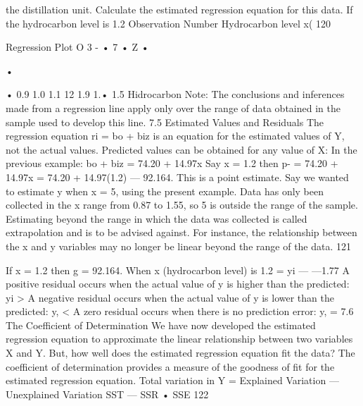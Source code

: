 the distillation unit. Calculate the estimated regression equation for this data. If the hydrocarbon 
level is 1.2%
Observation Number Hydrocarbon level x(%
120 


Regression Plot 
O 
3 - 
• 7 • Z • 

• 

• 
0.9 1.0 1.1 12 1.9 1.• 1.5 
Hidrocarbon 
Note: The conclusions and inferences made from a regression line apply only over the range of data 
obtained in the sample used to develop this line. 
7.5 Estimated Values and Residuals 
The regression equation ri = bo + biz is an equation for the estimated values of Y, not the actual values. Predicted values can be obtained for any value of X: In the previous example: bo + biz = 74.20 + 14.97x Say x = 1.2 then p- = 74.20 + 14.97x = 74.20 + 14.97(1.2) — 92.164. This is a point estimate. Say we wanted to estimate y when x = 5, using the present example. Data has only been collected in the x range from 0.87 to 1.55, so 5 is outside the range of the sample. Estimating beyond the range in which the data was collected is called extrapolation and is to be advised against. For instance, the relationship between the x and y variables may no longer be linear beyond the range of the data. 
121 




If x = 1.2 then g = 92.164. 
When x (hydrocarbon level) is 1.2%
= yi — 
—1.77 
A positive residual occurs when the actual value of y is higher than the predicted: yi > A negative residual occurs when the actual value of y is lower than the predicted: y, < A zero residual occurs when there is no prediction error: y, = 
7.6 The Coefficient of Determination 
We have now developed the estimated regression equation to approximate the linear relationship 
between two variables X and Y. But, how well does the estimated regression equation fit the data? 
The coefficient of determination provides a measure of the goodness of fit for the estimated 
regression equation. 
Total variation in Y = Explained Variation — Unexplained Variation 
SST — SSR • SSE 
122 



